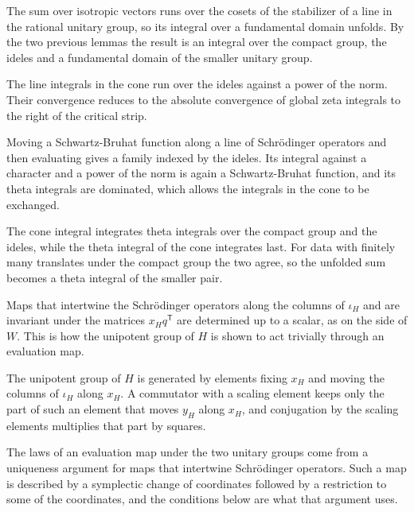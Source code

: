 The sum over isotropic vectors runs over the cosets of the stabilizer of a line
in the rational unitary group, so its integral over a fundamental domain
unfolds. By the two previous lemmas the result is an integral over the compact
group, the ideles and a fundamental domain of the smaller unitary group.

The line integrals in the cone run over the ideles against a power of the norm.
Their convergence reduces to the absolute convergence of global zeta integrals
to the right of the critical strip.

Moving a Schwartz-Bruhat function along a line of Schrödinger operators and then
evaluating gives a family indexed by the ideles. Its integral against a
character and a power of the norm is again a Schwartz-Bruhat function, and its
theta integrals are dominated, which allows the integrals in the cone to be
exchanged.

The cone integral integrates theta integrals over the compact group and the
ideles, while the theta integral of the cone integrates last. For data with
finitely many translates under the compact group the two agree, so the
unfolded sum becomes a theta integral of the smaller pair.

Maps that intertwine the Schrödinger operators along the columns of $\iota_H$
and are invariant under the matrices $x_Hq^{\mathsf T}$ are determined up to a
scalar, as on the side of $W$. This is how the unipotent group of $H$ is shown
to act trivially through an evaluation map.

The unipotent group of $H$ is generated by elements fixing $x_H$ and moving the
columns of $\iota_H$ along $x_H$. A commutator with a scaling element keeps only
the part of such an element that moves $y_H$ along $x_H$, and conjugation by the
scaling elements multiplies that part by squares.

The laws of an evaluation map under the two unitary groups come from a
uniqueness argument for maps that intertwine Schrödinger operators. Such a map
is described by a symplectic change of coordinates followed by a restriction to
some of the coordinates, and the conditions below are what that argument uses.

